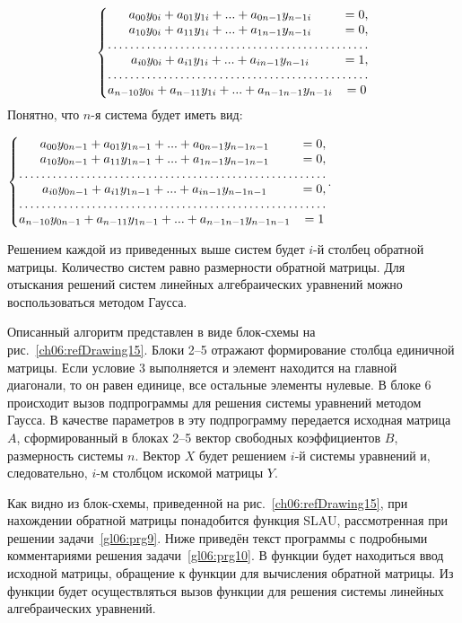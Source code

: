 \begin{equation*}
\left\{\begin{matrix}
a_{00}y_{0i}+a_{01}y_{1i}+...+a_{0n-1}y_{n-1i}&=0,\\
a_{10}y_{0i}+a_{11}y_{1i}+...+a_{1n-1}y_{n-1i}&=0,\\
\hdotsfor{2}\\
a_{i0}y_{0i}+a_{i1}y_{1i}+...+a_{in-1}y_{n-1i}&=1,\\
\hdotsfor{2}\\
a_{n-10}y_{0i}+a_{n-11}y_{1i}+...+a_{n-1n-1}y_{n-1i}&=0
\end{matrix}\right.
\end{equation*}
Понятно, что $n$-я система будет иметь вид:

$\left\{\begin{matrix}
a_{00}y_{0n-1}+a_{01}y_{1n-1}+...+a_{0n-1}y_{n-1n-1}&=0,\\
a_{10}y_{0n-1}+a_{11}y_{1n-1}+...+a_{1n-1}y_{n-1n-1}&=0,\\
\hdotsfor{2}\\
a_{i0}y_{0n-1}+a_{i1}y_{1n-1}+...+a_{in-1}y_{n-1n-1}&=0,\\
\hdotsfor{2}\\
a_{n-10}y_{0n-1}+a_{n-11}y_{1n-1}+...+a_{n-1n-1}y_{n-1n-1}&=1
\end{matrix}\right.$.

Решением каждой из приведенных выше систем будет $i$-й столбец обратной матрицы. Количество систем равно
размерности обратной матрицы. Для отыскания решений систем линейных алгебраических уравнений можно воспользоваться
методом Гаусса. 

Описанный алгоритм представлен в виде блок-схемы на рис.~\ref{ch06:refDrawing15}. Блоки 2–5 отражают формирование столбца
единичной матрицы. Если условие 3 выполняется и элемент находится на главной диагонали, то он равен единице, все
остальные элементы нулевые. В блоке 6 происходит вызов подпрограммы для решения системы уравнений методом Гаусса. В
качестве параметров в эту подпрограмму передается исходная матрица $A$, сформированный в блоках 2–5 вектор свободных
коэффициентов $B$, размерность системы $n$. Вектор $X$ будет решением $i$-й системы уравнений и, следовательно, $i$-м
столбцом искомой матрицы $Y$.

Как видно из блок-схемы, приведенной на рис.~\ref{ch06:refDrawing15}, при нахождении обратной матрицы понадобится функция
SLAU, рассмотренная при решении задачи~\ref{gl06:prg9}. Ниже приведён текст программы с подробными комментариями решения
задачи~\ref{gl06:prg10}. В функции  будет находиться ввод исходной матрицы, обращение 
к функции  для
вычисления обратной матрицы. Из функции  будет осуществляться вызов функции  
для решения системы линейных
алгебраических уравнений.

